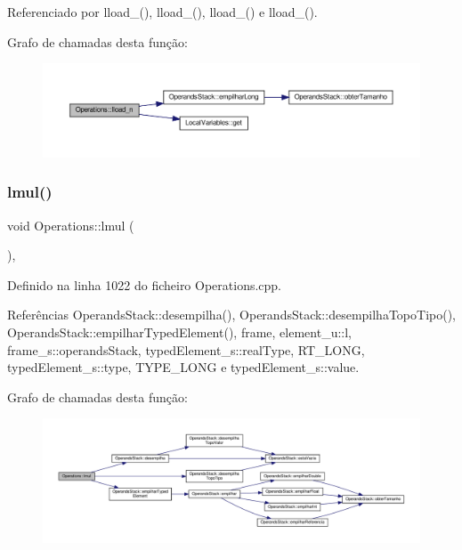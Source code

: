 Referenciado por lload\+\_(), lload\+\_(), lload\+\_() e lload\+\_().

Grafo de chamadas desta função\+:
\nopagebreak
\begin{figure}[H]
\begin{center}
\leavevmode
\includegraphics[width=350pt]{classOperations_a4f70442aed776d9ccae4dfd379715cd4_cgraph}
\end{center}
\end{figure}
\mbox{\label{classOperations_ae23a8dfdcc02432b6f880334fa4a7c59}} 
\subsubsection{\texorpdfstring{lmul()}{lmul()}}
{\footnotesize\ttfamily void Operations\+::lmul (\begin{DoxyParamCaption}{ }\end{DoxyParamCaption})\hspace{0.3cm}{\ttfamily [static]}, {\ttfamily [private]}}



Definido na linha 1022 do ficheiro Operations.\+cpp.



Referências Operands\+Stack\+::desempilha(), Operands\+Stack\+::desempilha\+Topo\+Tipo(), Operands\+Stack\+::empilhar\+Typed\+Element(), frame, element\+\_\+u\+::l, frame\+\_\+s\+::operands\+Stack, typed\+Element\+\_\+s\+::real\+Type, R\+T\+\_\+\+L\+O\+NG, typed\+Element\+\_\+s\+::type, T\+Y\+P\+E\+\_\+\+L\+O\+NG e typed\+Element\+\_\+s\+::value.

Grafo de chamadas desta função\+:
\nopagebreak
\begin{figure}[H]
\begin{center}
\leavevmode
\includegraphics[width=350pt]{classOperations_ae23a8dfdcc02432b6f880334fa4a7c59_cgraph}
\end{center}
\end{figure}
\mbox{\label{classOperations_a0a14cc7ee880b5d5f1c3b532e8e2117c}} 
